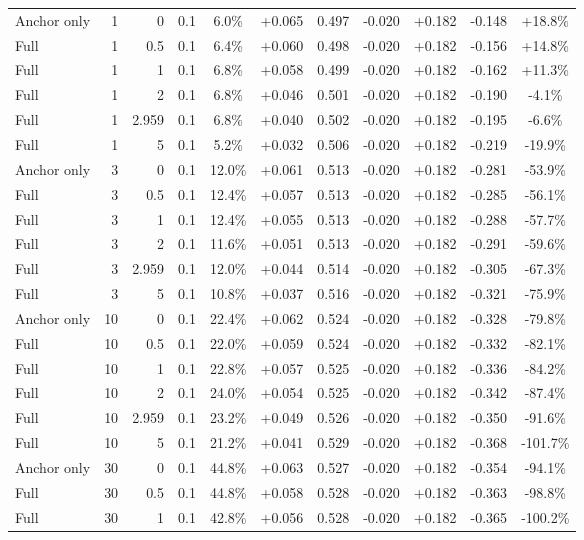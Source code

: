 \begin{table}[htbp]
\begin{tabular}{lrrrccccccc}
Anchor only & 1 & 0 & 0.1 & 6.0\% & +0.065 & 0.497 & -0.020 & +0.182 & -0.148 & +18.8\% \\
Full & 1 & 0.5 & 0.1 & 6.4\% & +0.060 & 0.498 & -0.020 & +0.182 & -0.156 & +14.8\% \\
Full & 1 & 1 & 0.1 & 6.8\% & +0.058 & 0.499 & -0.020 & +0.182 & -0.162 & +11.3\% \\
Full & 1 & 2 & 0.1 & 6.8\% & +0.046 & 0.501 & -0.020 & +0.182 & -0.190 & -4.1\% \\
Full & 1 & 2.959 & 0.1 & 6.8\% & +0.040 & 0.502 & -0.020 & +0.182 & -0.195 & -6.6\% \\
Full & 1 & 5 & 0.1 & 5.2\% & +0.032 & 0.506 & -0.020 & +0.182 & -0.219 & -19.9\% \\
Anchor only & 3 & 0 & 0.1 & 12.0\% & +0.061 & 0.513 & -0.020 & +0.182 & -0.281 & -53.9\% \\
Full & 3 & 0.5 & 0.1 & 12.4\% & +0.057 & 0.513 & -0.020 & +0.182 & -0.285 & -56.1\% \\
Full & 3 & 1 & 0.1 & 12.4\% & +0.055 & 0.513 & -0.020 & +0.182 & -0.288 & -57.7\% \\
Full & 3 & 2 & 0.1 & 11.6\% & +0.051 & 0.513 & -0.020 & +0.182 & -0.291 & -59.6\% \\
Full & 3 & 2.959 & 0.1 & 12.0\% & +0.044 & 0.514 & -0.020 & +0.182 & -0.305 & -67.3\% \\
Full & 3 & 5 & 0.1 & 10.8\% & +0.037 & 0.516 & -0.020 & +0.182 & -0.321 & -75.9\% \\
Anchor only & 10 & 0 & 0.1 & 22.4\% & +0.062 & 0.524 & -0.020 & +0.182 & -0.328 & -79.8\% \\
Full & 10 & 0.5 & 0.1 & 22.0\% & +0.059 & 0.524 & -0.020 & +0.182 & -0.332 & -82.1\% \\
Full & 10 & 1 & 0.1 & 22.8\% & +0.057 & 0.525 & -0.020 & +0.182 & -0.336 & -84.2\% \\
Full & 10 & 2 & 0.1 & 24.0\% & +0.054 & 0.525 & -0.020 & +0.182 & -0.342 & -87.4\% \\
Full & 10 & 2.959 & 0.1 & 23.2\% & +0.049 & 0.526 & -0.020 & +0.182 & -0.350 & -91.6\% \\
Full & 10 & 5 & 0.1 & 21.2\% & +0.041 & 0.529 & -0.020 & +0.182 & -0.368 & -101.7\% \\
Anchor only & 30 & 0 & 0.1 & 44.8\% & +0.063 & 0.527 & -0.020 & +0.182 & -0.354 & -94.1\% \\
Full & 30 & 0.5 & 0.1 & 44.8\% & +0.058 & 0.528 & -0.020 & +0.182 & -0.363 & -98.8\% \\
Full & 30 & 1 & 0.1 & 42.8\% & +0.056 & 0.528 & -0.020 & +0.182 & -0.365 & -100.2\% \\

\end{tabular}
\end{table}
